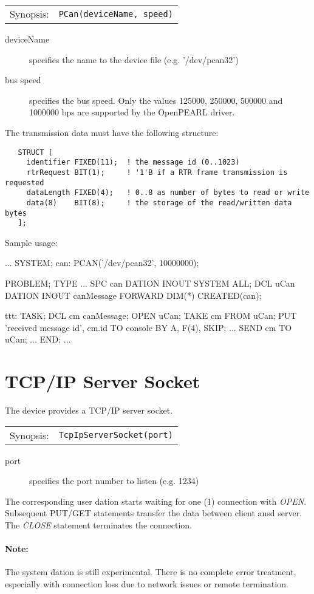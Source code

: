 \begin{tabular}{ll}
Synopsis: & \verb|PCan(deviceName, speed)|\\ 
\end{tabular}

\begin{description}
\item[deviceName] specifies the name to the device file (e.g. '/dev/pcan32')
\item[bus speed] specifies the bus speed. 
Only the values 125000, 250000, 500000 and 1000000 bps are supported by 
the OpenPEARL driver.
\end{description}

The transmission data must have the following structure:

\begin{verbatim}
   STRUCT [
     identifier FIXED(11);  ! the message id (0..1023) 
     rtrRequest BIT(1);     ! '1'B if a RTR frame transmission is requested
     dataLength FIXED(4);   ! 0..8 as number of bytes to read or write
     data(8)    BIT(8);     ! the storage of the read/written data bytes
   ];
\end{verbatim}

Sample usage:
\begin{PEARLCode}
...
SYSTEM;
   can: PCAN('/dev/pcan32', 10000000);

PROBLEM;
   TYPE ... 
   SPC can DATION INOUT SYSTEM ALL;
   DCL uCan DATION INOUT canMessage FORWARD DIM(*) CREATED(can);

ttt: TASK;
   DCL cm canMessage;
   OPEN uCan;
   TAKE cm FROM uCan;
   PUT 'received message id', cm.id TO console BY A, F(4), SKIP;
...
   SEND cm TO uCan;
...
END;
...
\end{PEARLCode}

\section{TCP/IP Server Socket}
The device provides a TCP/IP server socket.

\begin{tabular}{ll}
Synopsis: & \verb|TcpIpServerSocket(port)|\\ 
\end{tabular}

\begin{description}
\item[port] specifies the port number to listen (e.g. 1234)
\end{description}

The corresponding user dation starts waiting for one (1) connection with {\em OPEN}.
Subsequent PUT/GET statements transfer the data between client ansd server.
The {\em CLOSE} statement terminates the connection.

\paragraph{Note:} The system dation is still experimental. 
There is no complete error treatment, especially with connection loss due 
to network issues or remote termination.


